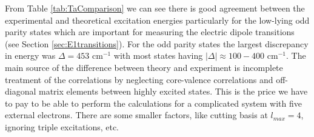 \documentclass[10pt,a4paper, twoside, openright]{report}
\begin{document}
\linebreak
From Table \ref{tab:TaComparison} we can see there is good agreement between the experimental and theoretical excitation energies particularly for the low-lying odd parity 
states which are important for measuring the electric dipole transitions (see Section \ref{sec:E1transitions}). For the odd parity
states the largest discrepancy in energy was $\Delta = 453$ cm$^{-1}$ with most states having $|\Delta| \approx 100-400$ 
cm$^{-1}$. The main source of the difference between theory and experiment is incomplete treatment of the correlations by neglecting core-valence correlations and off-diagonal matrix elements between
highly excited states. This is the price we have to pay to be able to perform the calculations for a
complicated system with five external electrons. There are some smaller factors, like cutting basis at $l_{max}=4$, 
ignoring triple excitations, etc.
\end{document}
